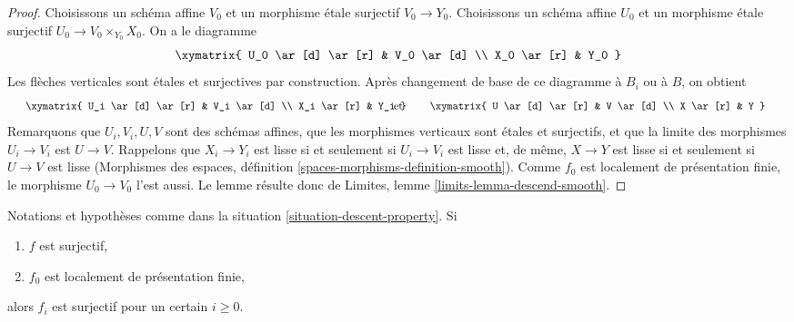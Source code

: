 \begin{proof}
Choisissons un schéma affine $V_0$ et un morphisme étale surjectif
$V_0 \to Y_0$. Choisissons un schéma affine $U_0$ et un morphisme étale
surjectif $U_0 \to V_0 \times_{Y_0} X_0$. On a le diagramme
$$
\xymatrix{
U_0 \ar[d] \ar[r] & V_0 \ar[d] \\
X_0 \ar[r] & Y_0
}
$$
Les flèches verticales sont étales et surjectives par construction.
Après changement de base de ce diagramme à $B_i$ ou à $B$, on obtient
$$
\vcenter{
\xymatrix{
U_i \ar[d] \ar[r] & V_i \ar[d] \\
X_i \ar[r] & Y_i
}
}
\quad\text{et}\quad
\vcenter{
\xymatrix{
U \ar[d] \ar[r] & V \ar[d] \\
X \ar[r] & Y
}
}
$$
Remarquons que $U_i, V_i, U, V$ sont des schémas affines,
que les morphismes verticaux sont étales et surjectifs, et que la limite des
morphismes $U_i \to V_i$ est $U \to V$. Rappelons que $X_i \to Y_i$ est lisse
si et seulement si $U_i \to V_i$ est lisse et, de même,
$X \to Y$ est lisse si et seulement si $U \to V$ est lisse
(Morphismes des espaces, définition \ref{spaces-morphisms-definition-smooth}).
Comme $f_0$ est localement de présentation
finie, le morphisme $U_0 \to V_0$ l'est aussi. Le lemme résulte donc
de Limites, lemme \ref{limits-lemma-descend-smooth}.
\end{proof}

\begin{lemma}
\label{lemma-descend-surjective}
Notations et hypothèses comme dans la
situation \ref{situation-descent-property}. Si
\begin{enumerate}
\item $f$ est surjectif,
\item $f_0$ est localement de présentation finie,
\end{enumerate}
alors $f_i$ est surjectif pour un certain $i \geq 0$.
\end{lemma}

